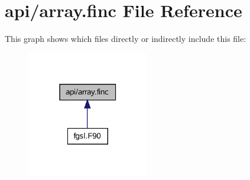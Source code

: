 \hypertarget{array_8finc}{}\section{api/array.finc File Reference}
\label{array_8finc}
This graph shows which files directly or indirectly include this file\+:\nopagebreak
\begin{figure}[H]
\begin{center}
\leavevmode
\includegraphics[width=150pt]{array_8finc__dep__incl}
\end{center}
\end{figure}
